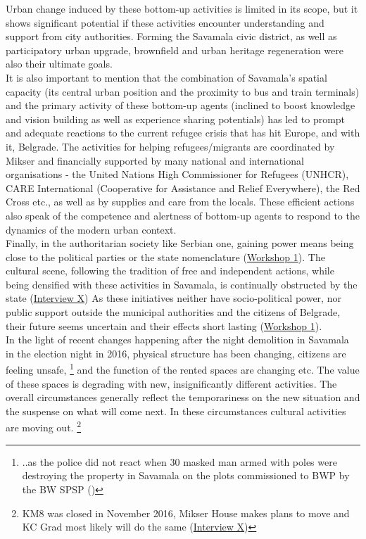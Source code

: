 \documentclass[11pt]{report}
\begin{document}
Urban change induced by these bottom-up activities is limited in its scope, but it shows significant potential if these activities encounter understanding and support from city authorities.
Forming the Savamala civic district, as well as participatory urban upgrade, brownfield and urban heritage regeneration were also their ultimate goals.
\\

It is also important to mention that the combination of Savamala’s spatial capacity (its central urban position and the proximity to bus and train terminals) and the primary activity of these bottom-up agents (inclined to boost knowledge and vision building as well as experience sharing potentials) has led to prompt and adequate reactions to the current refugee crisis that has hit Europe, and with it, Belgrade.
The activities for helping refugees/migrants are coordinated by Mikser and financially supported by many national and international organisations - the United Nations High Commissioner for Refugees (UNHCR), CARE International (Cooperative for Assistance and Relief Everywhere), the Red Cross etc., as well as by supplies and care from the locals.  These efficient actions also speak of the competence and alertness of bottom-up agents to respond to the dynamics of the modern urban context.
\\

Finally, in the authoritarian society like Serbian one, gaining power means being close to the political parties or the state nomenclature
(\href{Expert Workshop}{Workshop 1}).
The cultural scene, following the tradition of free and independent actions, while being densified with these activities in Savamala, is continually obstructed by the state
(\href{InterviewX}{Interview X})
As these initiatives neither have socio-political power, nor public support outside the municipal authorities and the citizens of Belgrade, their future seems uncertain and their effects short lasting (\href{Expert Workshop}{Workshop 1}).
\\

In the light of recent changes happening after the night demolition in Savamala in the election night in 2016, physical structure has been changing, citizens are feeling unsafe,
\footnote{..as the police did not react when 30 masked man armed with poles were destroying the property in Savamala on the plots commissioned to BWP by the BW SPSP (\cite{ref media})}
and the function of the rented spaces are changing etc.
The value of these spaces is degrading with new, insignificantly different activities.
The overall circumstances generally reflect the temporariness on the new situation and the suspense on what will come next.
In these circumstances cultural activities are moving out.
\footnote{KM8 was closed in November 2016, Mikser House makes plans to move and KC Grad most likely will do the same (\href{InterviewX}{Interview X})}
\\
\end{document}
